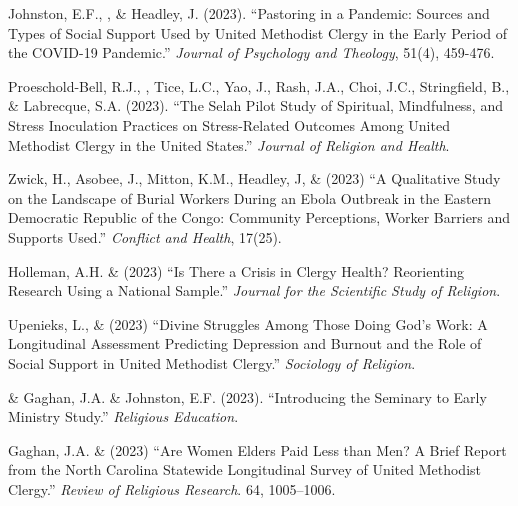 \begin{etaremune}
\item Johnston, E.F., \Eagle, \& Headley, J. (2023). ``Pastoring in a Pandemic: Sources and Types of Social Support Used by United Methodist Clergy in the Early Period of the COVID-19 Pandemic.'' \textit{Journal of Psychology and Theology}, 51(4), 459-476. 

\item Proeschold-Bell, R.J., \Eagle, Tice, L.C., Yao, J., Rash, J.A., Choi, J.C., Stringfield, B., \& Labrecque, S.A. (2023). ``The Selah Pilot Study of Spiritual, Mindfulness, and Stress Inoculation Practices on Stress-Related Outcomes Among United Methodist Clergy in the United States.'' \textit{Journal of Religion and Health}. 
	
\item Zwick, H., Asobee, J., Mitton, K.M., Headley, J, \& \Eagle\CS \hspace{0.1em} (2023) ``A Qualitative Study on the Landscape of Burial Workers During an Ebola Outbreak in the Eastern Democratic Republic of the Congo: Community Perceptions, Worker Barriers and Supports Used.''  \textit{Conflict and Health}, 17(25). 

\item Holleman, A.H. \& \Eagle\hspace{.01em} (2023) ``Is There a Crisis in Clergy Health? Reorienting Research Using a National Sample.'' \textit{Journal for the Scientific Study of Religion}. 

\item Upenieks, L., \& \Eagle\hspace{0.1em} (2023) ``Divine Struggles Among Those Doing God’s Work: A Longitudinal Assessment Predicting Depression and Burnout and the Role of Social Support in United Methodist Clergy.'' \textit{Sociology of Religion}.  

\item \Eagle \hspace{.01em} \& Gaghan, J.A. \& Johnston, E.F. (2023). ``Introducing the Seminary to Early Ministry Study.''  \textit{Religious Education}. 

\item Gaghan, J.A. \& \Eagle \hspace{0.1em} (2023) ``Are Women Elders Paid Less than Men? A Brief Report from the North Carolina Statewide Longitudinal Survey of United Methodist Clergy.'' \textit{Review of Religious Research}. 64, 1005--1006. 
	

\end{etaremune}
